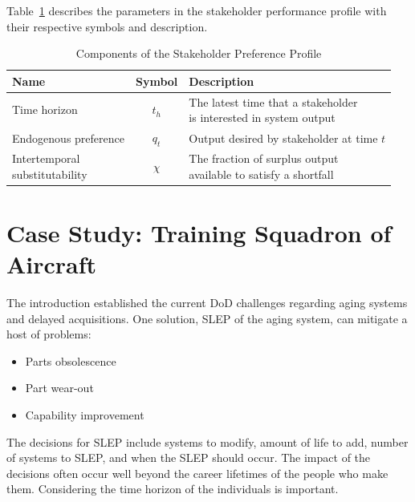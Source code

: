 \documentclass[preprint,12pt]{elsarticle}
\begin{document}
Table~\ref{t:StakeParameters} describes the parameters in the
stakeholder performance profile with their respective symbols and
description.

\begin{table}[h]
  \begin{center}
  \caption{Components of the Stakeholder Preference Profile}
  \label{t:StakeParameters}
  \begin{tabular}{l c l}
    \hline
    \hline
    \textbf{Name} & \textbf{Symbol} & \textbf{Description} \\
    \hline
    Time horizon &
    $t_h$ &
    \makecell[l]{The latest time that a stakeholder \\
              is interested in system output} \\
    Endogenous preference &
    $q_t$ &
    \makecell[l]{Output desired by stakeholder\\
              at time $t$} \\
    \makecell[l]{Intertemporal\\substitutability} &
    $\chi$ &
    \makecell[l]{The fraction of surplus output \\
              available to satisfy a shortfall}\\
    \hline
  \end{tabular}
  \end{center}
\end{table}

\section{Case Study: Training Squadron of Aircraft}
\label{s:CaseStudy}
The introduction established the current DoD challenges regarding
aging systems and delayed acquisitions\cite{Burgess2015,LaGrone2016,awstf35}. One solution, SLEP of the
aging system, can mitigate a host of problems: 
\begin{itemize}
\item Parts obsolescence \cite{Tomczykowski2001}
\item Part wear-out \cite{jennings2018}
\item Capability improvement \cite{Burgess2015}
\end{itemize}

The decisions for SLEP include systems to modify, amount of life to add, number of
systems to SLEP, and when the SLEP should occur. The impact of the
decisions often occur well beyond the career lifetimes of the people
who make them. Considering the time horizon of the individuals is important.
\end{document}
